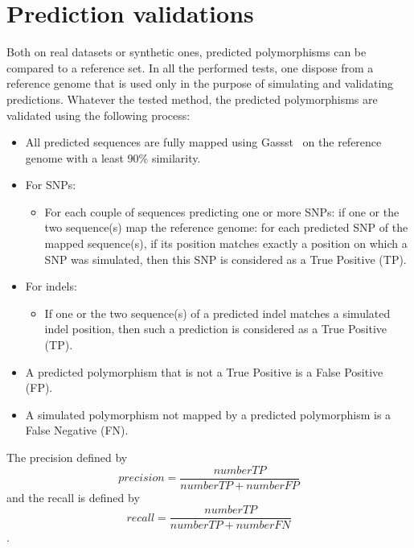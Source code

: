 \documentclass{bmcart}
\begin{document}
\section*{Prediction validations}
Both on real datasets or synthetic ones, predicted polymorphisms can be compared to a reference set. In all the performed tests, one dispose from a reference genome that is used only in the purpose of simulating and validating predictions.
Whatever the tested method, the predicted polymorphisms are validated using the following process:
\begin{itemize}
	\item All predicted sequences are fully mapped using Gassst~\cite{Rizk2010} on the reference genome with a least 90\% similarity.
	\item For SNPs:
	\begin{itemize}
		\item For each couple of sequences predicting one or more SNPs: if one or the two sequence(s) map the reference genome: for each predicted SNP of the mapped sequence(s), if its position matches exactly a position on which a SNP was simulated, then this SNP is considered as a True Positive (TP).
	\end{itemize}
	\item For indels:
	\begin{itemize}
		\item If one or the two sequence(s) of a predicted indel matches a simulated indel position, then such a prediction is considered as a True Positive (TP).
	\end{itemize}
	\item A predicted polymorphism that is not a True Positive is a False Positive (FP).
	\item A simulated polymorphism not mapped by a predicted polymorphism is a False Negative (FN).
\end{itemize}

The precision defined by $$precision=\frac{number TP}{number TP+ number FP}$$ and the recall is defined by $$recall=\frac{number TP}{number TP+ number FN}$$.

\end{document}
